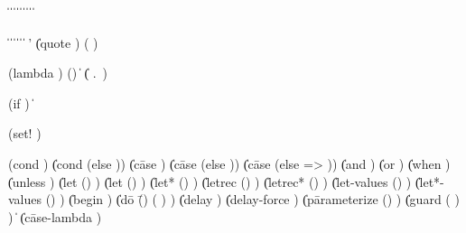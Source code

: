 \begin{grammar}%
 \: 
\>  \| 
\>  \| 
\>  \| 
\>  \| 
\>  \| 
\>  \| 
\>  \| 
\>  \| 
\>  \| 

 \:  \| 
 \:  \| 
\>  \|  \|  \|  \| 
 \: ' \| (quote )
 \: ( )
 \: 
 \: 

 \: (lambda  )
 \: () \| 
\>  \| ( .\ )
 \:   
 \:  
 \: 

 \: (if   )
 \: 
 \: 
 \:  \| 

 \: (set!  )

 \:
\>  \> (cond )
\>  \| (cond  (else ))
\>  \| (c\=ase 
\>       \>)
\>  \| (c\=ase 
\>       \>
\>       \>(else ))
\>  \| (c\=ase 
\>       \>
\>       \>(else => ))
\>  \| (and )
\>  \| (or )
\>  \| (when  )
\>  \| (unless  )
\>  \| (let () )
\>  \| (let  () )
\>  \| (let* () )
\>  \| (letrec () )
\>  \| (letrec* () )
\>  \| (let-values () )
\>  \| (let*-values () )
\>  \| (begin )
\>  \| (d\=o \=()
\>       \>  \>( )
\>       \>)
\>  \| (delay )
\>  \| (delay-force )
\>  \| (p\=arameterize ()
\>       \> )
\>  \| (guard ( ) )
\>  \| 
\>  \| (c\=ase-lambda )


\end{grammar}
